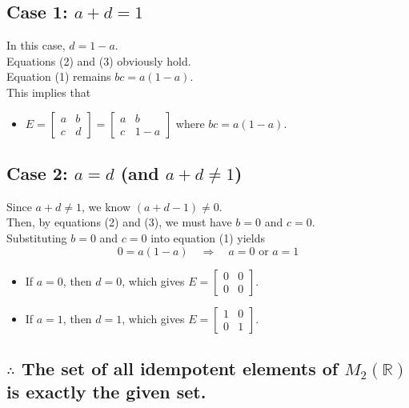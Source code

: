 \documentclass[11pt, a4paper]{article}
\begin{document}
\subsection*{Case 1: $a+d = 1$}
In this case, $d = 1-a$.\\
Equations (2) and (3) obviously hold.\\
Equation (1) remains $bc = a(1-a)$.\\
This implies that 
\begin{itemize}
    \item $E = \begin{bmatrix} a & b \\ c & d \end{bmatrix} = \begin{bmatrix} a & b \\ c & 1-a \end{bmatrix}$ where $bc = a(1-a)$.
\end{itemize}

\subsection*{Case 2: $a=d$ (and $a+d \neq 1$)}
Since $a+d \neq 1$, we know $(a+d-1) \neq 0$.\\
Then, by equations (2) and (3), we must have $b=0$ and $c=0$.\\
Substituting $b=0$ and $c=0$ into equation (1) yields
\[
0 = a(1-a) \quad \Rightarrow \quad a=0 \text{ or } a=1
\]
\begin{itemize}
    \item If $a=0$, then $d=0$, which gives $E = \begin{bmatrix} 0 & 0 \\ 0 & 0 \end{bmatrix}$.
    \item If $a=1$, then $d=1$, which gives $E = \begin{bmatrix} 1 & 0 \\ 0 & 1 \end{bmatrix}$.
\end{itemize}

\subsection*{$\therefore$ The set of all idempotent elements of $M_2(\mathbb{R})$ is exactly the given set.}
\end{document}
